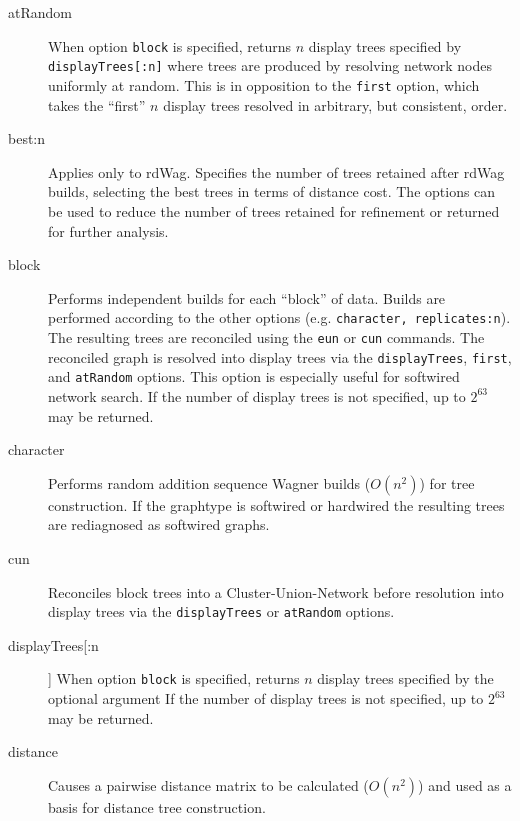 	\begin{description}
		\item [atRandom] When option \texttt{block} is specified, returns $n$ display trees specified by 
		\texttt{displayTrees[:n]} where trees are produced by resolving network nodes uniformly at random. 
		This is in opposition to the \texttt{first} option, which takes the ``first'' $n$ display trees resolved 
		in arbitrary, but consistent, order.

		\item [best:n] Applies only to rdWag. Specifies the number of trees retained after rdWag builds, 
		selecting the best trees in terms of distance cost. The options can be used to reduce
		the number of trees retained for refinement or returned for further analysis. 

		\item[block] Performs independent builds for each ``block'' of data. Builds are performed according 
		to the other options (e.g. \texttt{character, replicates:n}). The resulting trees are reconciled using the 
		\texttt{eun} or \texttt{cun} commands. The reconciled graph is resolved into display trees via the 
		\texttt{displayTrees}, \texttt{first}, and \texttt{atRandom} options. This option is especially useful 
		for softwired network search. If the number of display trees is not specified, up to $2^{63}$ may be 
		returned.

		\item [character] Performs random addition sequence Wagner \citep{Farris1970} builds ($O(n^2)$) 
		for tree construction. If the graphtype is softwired or hardwired the resulting trees are rediagnosed 
		as softwired graphs.
		
		\item [cun] Reconciles block trees into a Cluster-Union-Network \citep{Baroni2005} before resolution 
		into display trees via the \texttt{displayTrees} or \texttt{atRandom} options.

		\item [displayTrees[:n]] When option \texttt{block} is specified, returns $n$ display trees specified 
		by the optional argument If the number of display trees is not specified, up to $2^{63}$ may be returned.

		\item [distance] Causes a pairwise distance matrix to be calculated ($O(n^2)$) and used as a basis 
		for distance tree construction.
		
	
			\begin{description}
			

\end{description}
\end{description}

